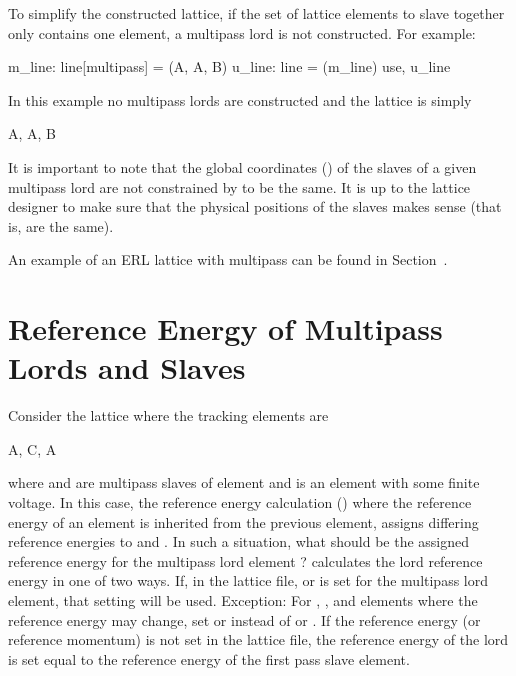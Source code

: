 To simplify the constructed lattice, if the set of lattice elements to slave together only contains
one element, a multipass lord is not constructed. For example:
\begin{example}
  m_line: line[multipass] = (A, A, B)
  u_line: line = (m_line)
  use, u_line
\end{example}
In this example no multipass lords are constructed and the lattice is simply
\begin{example}
  A, A, B
\end{example}

It is important to note that the global coordinates () of the slaves of a given
multipass lord are not constrained by \bmad to be the same. It is up to the lattice designer to make
sure that the physical positions of the slaves makes sense (that is, are the same).

An example of an ERL lattice with multipass can be found in Section~.

\section{Reference Energy of Multipass Lords and Slaves}
\label{s:ref.e.multi}

Consider the lattice where the tracking elements are
\begin{example}
  A, C, A
\end{example}
where  and  are multipass slaves of element  and  is an 
element with some finite voltage. In this case, the reference energy calculation ()
where the reference energy of an element is inherited from the previous element, assigns differing
reference energies to  and . In such a situation, what should be the assigned
reference energy for the multipass lord element ? \bmad calculates the lord reference energy
in one of two ways. If, in the lattice file,  or  is set for the multipass lord
element, that setting will be used. Exception: For , , and 
elements where the reference energy may change, set  or  instead of
 or .  If the reference energy (or reference momentum) is not set in the lattice
file, the reference energy of the lord is set equal to the reference energy of the first pass slave
element.

